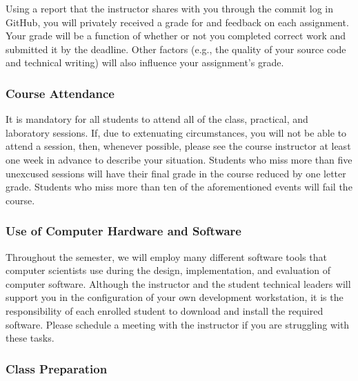 \documentclass[11pt]{article}
\begin{document}
Using a report that the instructor shares with you through the commit log in
GitHub, you will privately received a grade for and feedback on each assignment.
Your grade will be a function of whether or not you completed correct work and
submitted it by the deadline. Other factors (e.g., the quality of your source
code and technical writing) will also influence your assignment's grade.

\subsubsection*{Course Attendance}

It is mandatory for all students to attend all of the class, practical, and
laboratory sessions. If, due to extenuating circumstances, you will not be able
to attend a session, then, whenever possible, please see the course instructor
at least one week in advance to describe your situation. Students who miss more
than five unexcused sessions will have their final grade in the course reduced
by one letter grade. Students who miss more than ten of the aforementioned
events will fail the course.

\subsubsection*{Use of Computer Hardware and Software}

Throughout the semester, we will employ many different software tools that
computer scientists use during the design, implementation, and evaluation of
computer software. Although the instructor and the student technical leaders
will support you in the configuration of your own development workstation, it is
the responsibility of each enrolled student to download and install the required
software. Please schedule a meeting with the instructor if you are struggling
with these tasks.


\subsubsection*{Class Preparation}
\end{document}
